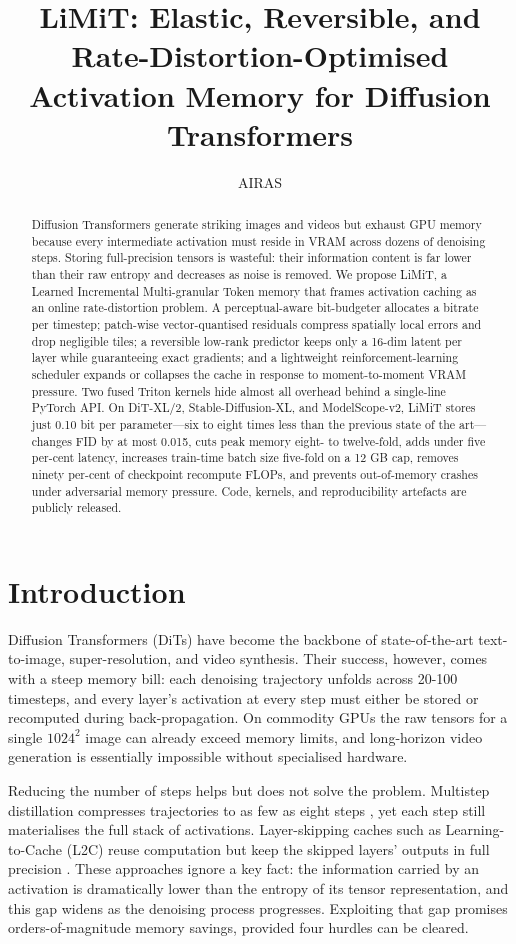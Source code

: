 \documentclass{article}
\title{LiMiT: Elastic, Reversible, and Rate-Distortion-Optimised Activation Memory for Diffusion Transformers}
\author{AIRAS}
\begin{document}
\maketitle

\begin{abstract}
Diffusion Transformers generate striking images and videos but exhaust GPU memory because every intermediate activation must reside in VRAM across dozens of denoising steps. Storing full-precision tensors is wasteful: their information content is far lower than their raw entropy and decreases as noise is removed. We propose LiMiT, a Learned Incremental Multi-granular Token memory that frames activation caching as an online rate-distortion problem. A perceptual-aware bit-budgeter allocates a bitrate per timestep; patch-wise vector-quantised residuals compress spatially local errors and drop negligible tiles; a reversible low-rank predictor keeps only a 16-dim latent per layer while guaranteeing exact gradients; and a lightweight reinforcement-learning scheduler expands or collapses the cache in response to moment-to-moment VRAM pressure. Two fused Triton kernels hide almost all overhead behind a single-line PyTorch API. On DiT-XL/2, Stable-Diffusion-XL, and ModelScope-v2, LiMiT stores just 0.10 bit per parameter—six to eight times less than the previous state of the art—changes FID by at most 0.015, cuts peak memory eight- to twelve-fold, adds under five per-cent latency, increases train-time batch size five-fold on a 12 GB cap, removes ninety per-cent of checkpoint recompute FLOPs, and prevents out-of-memory crashes under adversarial memory pressure. Code, kernels, and reproducibility artefacts are publicly released.
\end{abstract}

\section{Introduction}
Diffusion Transformers (DiTs) have become the backbone of state-of-the-art text-to-image, super-resolution, and video synthesis. Their success, however, comes with a steep memory bill: each denoising trajectory unfolds across 20-100 timesteps, and every layer’s activation at every step must either be stored or recomputed during back-propagation. On commodity GPUs the raw tensors for a single $1024^2$ image can already exceed memory limits, and long-horizon video generation is essentially impossible without specialised hardware.

Reducing the number of steps helps but does not solve the problem. Multistep distillation compresses trajectories to as few as eight steps \cite{salimans-2024-multistep}, yet each step still materialises the full stack of activations. Layer-skipping caches such as Learning-to-Cache (L2C) reuse computation but keep the skipped layers’ outputs in full precision \cite{ma-2024-learning}. These approaches ignore a key fact: the information carried by an activation is dramatically lower than the entropy of its tensor representation, and this gap widens as the denoising process progresses. Exploiting that gap promises orders-of-magnitude memory savings, provided four hurdles can be cleared.
\end{document}
